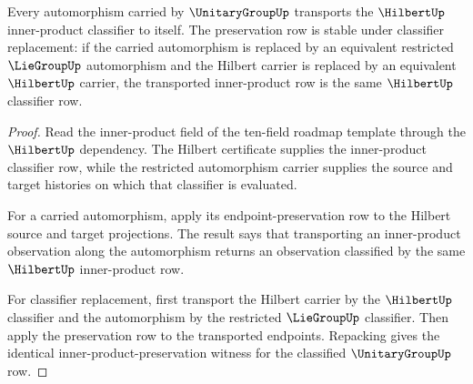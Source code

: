 \begin{theorem}\label{thm:unitarygroup-inner-product-preservation-obligation}
Every automorphism carried by $\UnitaryGroupUp$ transports the $\HilbertUp$ inner-product classifier to itself. The preservation row is stable under classifier replacement: if the carried automorphism is replaced by an equivalent restricted $\LieGroupUp$ automorphism and the Hilbert carrier is replaced by an equivalent $\HilbertUp$ carrier, the transported inner-product row is the same $\HilbertUp$ classifier row.
\end{theorem}
\begin{proof}
Read the inner-product field of the ten-field roadmap template through the $\HilbertUp$ dependency. The Hilbert certificate supplies the inner-product classifier row, while the restricted automorphism carrier supplies the source and target histories on which that classifier is evaluated.

For a carried automorphism, apply its endpoint-preservation row to the Hilbert source and target projections. The result says that transporting an inner-product observation along the automorphism returns an observation classified by the same $\HilbertUp$ inner-product row.

For classifier replacement, first transport the Hilbert carrier by the $\HilbertUp$ classifier and the automorphism by the restricted $\LieGroupUp$ classifier. Then apply the preservation row to the transported endpoints. Repacking gives the identical inner-product-preservation witness for the classified $\UnitaryGroupUp$ row.
\end{proof}

